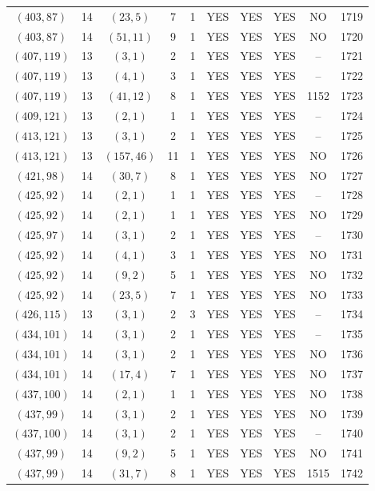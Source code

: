 \begin{longtable}{|c|c|c|c|c|c|c|c|c|c|}
$(403, 87)$ & 14 & $(23, 5)$ & 7 & 1 & YES & YES & YES & NO & 1719\\
$(403, 87)$ & 14 & $(51, 11)$ & 9 & 1 & YES & YES & YES & NO & 1720\\
$(407, 119)$ & 13 & $(3, 1)$ & 2 & 1 & YES & YES & YES & -- & 1721\\
$(407, 119)$ & 13 & $(4, 1)$ & 3 & 1 & YES & YES & YES & -- & 1722\\
$(407, 119)$ & 13 & $(41, 12)$ & 8 & 1 & YES & YES & YES & 1152 & 1723\\
$(409, 121)$ & 13 & $(2, 1)$ & 1 & 1 & YES & YES & YES & -- & 1724\\
$(413, 121)$ & 13 & $(3, 1)$ & 2 & 1 & YES & YES & YES & -- & 1725\\
$(413, 121)$ & 13 & $(157, 46)$ & 11 & 1 & YES & YES & YES & NO & 1726\\
$(421, 98)$ & 14 & $(30, 7)$ & 8 & 1 & YES & YES & YES & NO & 1727\\
$(425, 92)$ & 14 & $(2, 1)$ & 1 & 1 & YES & YES & YES & -- & 1728\\
$(425, 92)$ & 14 & $(2, 1)$ & 1 & 1 & YES & YES & YES & NO & 1729\\
$(425, 97)$ & 14 & $(3, 1)$ & 2 & 1 & YES & YES & YES & -- & 1730\\
$(425, 92)$ & 14 & $(4, 1)$ & 3 & 1 & YES & YES & YES & NO & 1731\\
$(425, 92)$ & 14 & $(9, 2)$ & 5 & 1 & YES & YES & YES & NO & 1732\\
$(425, 92)$ & 14 & $(23, 5)$ & 7 & 1 & YES & YES & YES & NO & 1733\\
$(426, 115)$ & 13 & $(3, 1)$ & 2 & 3 & YES & YES & YES & -- & 1734\\
$(434, 101)$ & 14 & $(3, 1)$ & 2 & 1 & YES & YES & YES & -- & 1735\\
$(434, 101)$ & 14 & $(3, 1)$ & 2 & 1 & YES & YES & YES & NO & 1736\\
$(434, 101)$ & 14 & $(17, 4)$ & 7 & 1 & YES & YES & YES & NO & 1737\\
$(437, 100)$ & 14 & $(2, 1)$ & 1 & 1 & YES & YES & YES & NO & 1738\\
$(437, 99)$ & 14 & $(3, 1)$ & 2 & 1 & YES & YES & YES & NO & 1739\\
$(437, 100)$ & 14 & $(3, 1)$ & 2 & 1 & YES & YES & YES & -- & 1740\\
$(437, 99)$ & 14 & $(9, 2)$ & 5 & 1 & YES & YES & YES & NO & 1741\\
$(437, 99)$ & 14 & $(31, 7)$ & 8 & 1 & YES & YES & YES & 1515 & 1742\\

\end{longtable}
